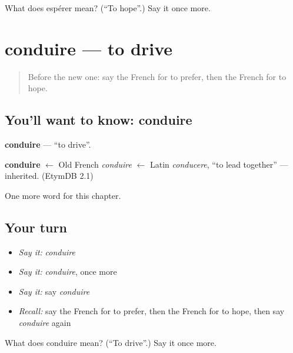\begin{tcolorbox}[breakable,colback=teal!4,colframe=teal!35!black,title={Before you move on}]
What does espérer mean? (\textquotedblleft{}To hope\textquotedblright{}.) Say it once more.
\end{tcolorbox}
\section[conduire]{conduire — to drive}

\label{lesson:FR-C138-conduire}



\begin{quote}
Before the new one: say the French for to prefer, then the French for to hope.
\end{quote}

\subsection*{You'll want to know: conduire}
\textbf{conduire} — \textquotedblleft{}to drive\textquotedblright{}.

\begin{cousinweb}
\textbf{conduire} $\leftarrow$ Old French \emph{conduire} $\leftarrow$ Latin \emph{conducere}, \textquotedblleft{}to lead together\textquotedblright{} — inherited. (EtymDB 2.1)
\end{cousinweb}

\begin{grammarlens}[title={What you've built}]
One more word for this chapter.
\end{grammarlens}

\subsection*{Your turn}
\begin{itemize}
\raggedright
  \item \emph{Say it:} \emph{conduire}
  \item \emph{Say it:} \emph{conduire}, once more
  \item \emph{Say it:} say \emph{conduire}
  \item \emph{Recall:} say the French for to prefer, then the French for to hope, then say \emph{conduire} again
\end{itemize}

\begin{tcolorbox}[breakable,colback=teal!4,colframe=teal!35!black,title={Before you move on}]
What does conduire mean? (\textquotedblleft{}To drive\textquotedblright{}.) Say it once more.
\end{tcolorbox}
